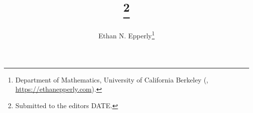 


\usepackage{amsfonts}
\usepackage{graphicx}
\usepackage{epstopdf}
\ifpdf
\else
\fi

\newcommand{\creflastconjunction}{, and~}



\title{\mytitle\thanks{Submitted to the editors DATE.
\funding{}}}

\author{Ethan N. Epperly\thanks{Department of Mathematics, University of California Berkeley (, \url{https://ethanepperly.com}).}}

\usepackage{amsopn}

